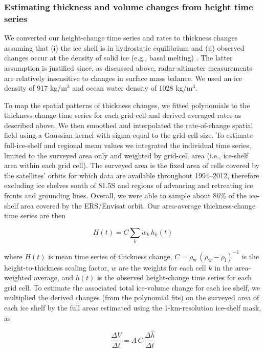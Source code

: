 \subsubsection*{Estimating thickness and volume changes from height time series}

\noindent
We converted our height-change time series and rates to thickness changes
assuming that (i) the ice shelf is in hydrostatic equilibrium and (ii)
observed changes occur at the density of solid ice (e.g., basal melting)
\parencite{Shepherd2010, Pritchard2012, Wingham2009}. The latter assumption is
justified since, as discussed above, radar-altimeter measurements are
relatively insensitive to changes in surface mass balance. We used an ice
density of 917 kg/m$^3$ and ocean water density of 1028 kg/m$^3$.

To map the spatial patterns of thickness changes, we fitted polynomials to the
thickness-change time series for each grid cell and derived averaged rates as
described above. We then smoothed and interpolated the rate-of-change spatial
field using a Gaussian kernel with sigma equal to the grid-cell size. To
estimate full-ice-shelf and regional mean values we integrated the individual
time series, limited to the surveyed area only and weighted by grid-cell area
(i.e., ice-shelf area within each grid cell). The surveyed area is the fixed
area of cells covered by the satellites' orbits for which data are available
throughout 1994--2012, therefore excluding ice shelves south of 81.5\degree S
and regions of advancing and retreating ice fronts and grounding lines.
Overall, we were able to sample about 86\% of the ice-shelf area covered by
the ERS/Envisat orbit. Our area-average thickness-change time series are then

\begin{equation}
  H(t) = C \sum_k w_k \, h_k(t)
\end{equation}

\noindent
where $H(t)$ is mean time series of thickness change,
$C = \rho_{\text{w}} \, (\rho_{\text{w}} - \rho_{\text{i}})^{-1}$ is the
height-to-thickness scaling factor, $w$ are the weights for each cell $k$
in the area-weighted average, and $h(t)$ is the observed height-change time
series for each grid cell. To estimate the associated total ice-volume change
for each ice shelf, we multiplied the derived changes (from the polynomial
fits) on the surveyed area of each ice shelf by the full areas estimated
using the 1-km-resolution ice-shelf mask, as

\begin{equation}
  \frac{\Delta V}{\Delta t} = A \, C \, \frac{\Delta \hat h}{\Delta t}
\end{equation}

